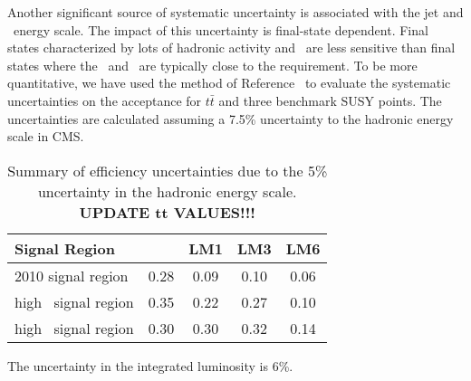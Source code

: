 Another significant source of systematic uncertainty is 
associated with the jet and \met\ energy scale.  The impact
of this uncertainty is final-state dependent.  Final
states characterized by lots of hadronic activity and \met\ are 
less sensitive than final states where the \met\ and \Ht\
are typically close to the requirement.  To be more quantitative,
we have used the method of Reference~\cite{ref:top} to evaluate
the systematic uncertainties on the acceptance for $t\bar{t}$ 
and three benchmark SUSY points.  The uncertainties are calculated
assuming a 7.5\% uncertainty to the hadronic energy scale in CMS.

\begin{table}[hbt]
\begin{center}
\caption{\label{tab:jetmet} 
Summary of efficiency uncertainties due to the 5\% uncertainty in the hadronic energy scale. {\bf UPDATE tt VALUES!!!}
}
\vspace{.25cm}
\begin{tabular}{l|cccc}
\hline
Signal Region             & \ttbar  &   LM1   &   LM3  &  LM6  \\
\hline
2010 signal region        &  0.28   &  0.09   &  0.10  &  0.06 \\
high \met\ signal region  &  0.35   &  0.22   &  0.27  &  0.10 \\ 
high \Ht\ signal region   &  0.30   &  0.30   &  0.32  &  0.14 \\
\hline
\end{tabular}
\end{center}
\end{table}

The uncertainty in the integrated luminosity is 6\%.

